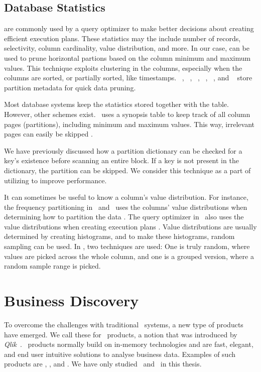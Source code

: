 \subsection{Database Statistics}
\label{sub:Database Statistics}
 are commonly used by a query optimizer to make better decisions about creating efficient execution plans. These statistics may the include number of records, selectivity, column cardinality, value distribution, and more. In our case,  can be used to prune horizontal partions based on the column minimum and maximum values. This technique exploits clustering in the columns, especially when the columns are sorted, or partially sorted, like timestamps. \oracle~\cite{Lahiri2015-mz}, \ibm~\cite{Raman2013-em}, \vertica~\cite{Lamb2012-kg}, \monetx~\cite{Boncz2005-wj}, \mssql~\cite{Larson2013-mc}, and \exasol~\cite{Exasol2014-xh} store partition metadata for quick data pruning.

Most database systems keep the statistics stored together with the table. However, other schemes exist. \ibm~uses a synopsis table to keep track of all column pages (partitions), including minimum and maximum values. This way, irrelevant pages can easily be skipped \cite{Raman2013-em}.

We have previously discussed how a partition dictionary can be checked for a key's existence before scanning an entire block. If a key is not present in the dictionary, the partition can be skipped. We consider this technique as a part of utilizing  to improve performance.

It can sometimes be useful to know a column's value distribution. For instance, the frequency partitioning in \blink~and \ibm~uses the columns' value distributions when determining how to partition the data \cite{Raman2008-gi, Raman2013-em}. The query optimizer in \mssql~also uses the value distributions when creating execution plans \cite{Larson2013-mc}. Value distributions are usually determined by creating histograms, and to make these histograms, random sampling can be used. In \mssql, two techniques are used: One is truly random, where values are picked across the whole column, and one is a grouped version, where a random sample range is picked.

\section{Business Discovery}
\label{sec:Business Discovery}
To overcome the challenges with traditional \bi~systems, a new type of products have emerged. We call these for \bd~products, a notion that was introduced by \textit{Qlik}~\cite{Qlik2014-vd}. \bd~products normally build on in-memory technologies and are fast, elegant, and end user intuitive solutions to analyse business data. Examples of such products are \powerpivot, \tableau, and \qlikview. We have only studied \qlikview~and \tableau~in this thesis.

